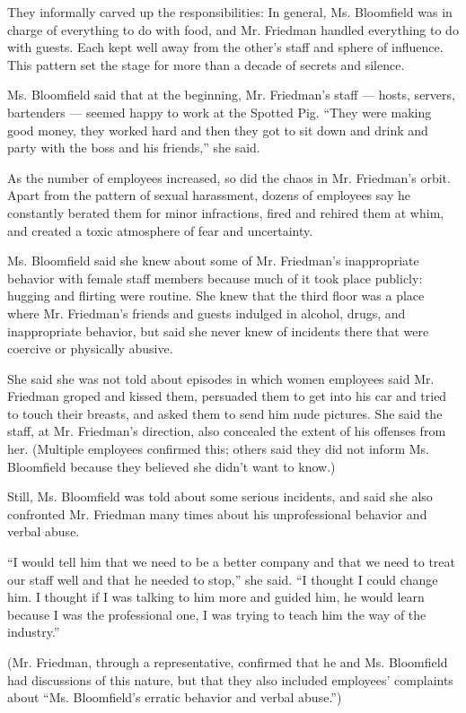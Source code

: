 They informally carved up the responsibilities: In general, Ms.
Bloomfield was in charge of everything to do with food, and Mr. Friedman
handled everything to do with guests. Each kept well away from the
other's staff and sphere of influence. This pattern set the stage for
more than a decade of secrets and silence.

Ms. Bloomfield said that at the beginning, Mr. Friedman's staff ---
hosts, servers, bartenders --- seemed happy to work at the Spotted Pig.
``They were making good money, they worked hard and then they got to sit
down and drink and party with the boss and his friends,'' she said.

As the number of employees increased, so did the chaos in Mr. Friedman's
orbit. Apart from the pattern of sexual harassment, dozens of employees
say he constantly berated them for minor infractions, fired and rehired
them at whim, and created a toxic atmosphere of fear and uncertainty.

Ms. Bloomfield said she knew about some of Mr. Friedman's inappropriate
behavior with female staff members because much of it took place
publicly: hugging and flirting were routine. She knew that the third
floor was a place where Mr. Friedman's friends and guests indulged in
alcohol, drugs, and inappropriate behavior, but said she never knew of
incidents there that were coercive or physically abusive.

She said she was not told about episodes in which women employees said
Mr. Friedman groped and kissed them, persuaded them to get into his car
and tried to touch their breasts, and asked them to send him nude
pictures. She said the staff, at Mr. Friedman's direction, also
concealed the extent of his offenses from her. (Multiple employees
confirmed this; others said they did not inform Ms. Bloomfield because
they believed she didn't want to know.)

Still, Ms. Bloomfield was told about some serious incidents, and said
she also confronted Mr. Friedman many times about his unprofessional
behavior and verbal abuse.

``I would tell him that we need to be a better company and that we need
to treat our staff well and that he needed to stop,'' she said. ``I
thought I could change him. I thought if I was talking to him more and
guided him, he would learn because I was the professional one, I was
trying to teach him the way of the industry.''

(Mr. Friedman, through a representative, confirmed that he and Ms.
Bloomfield had discussions of this nature, but that they also included
employees' complaints about ``Ms. Bloomfield's erratic behavior and
verbal abuse.'')

